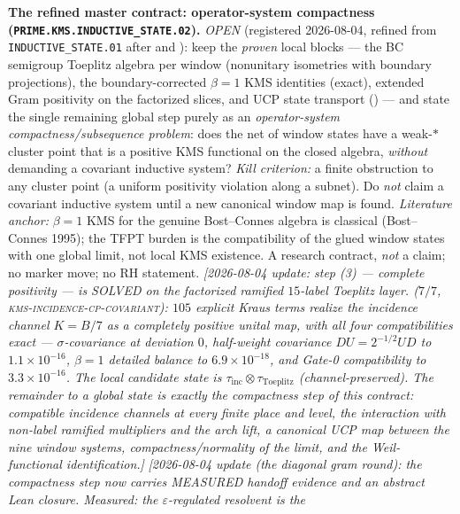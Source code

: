 \documentclass[11pt,a4paper]{article}
\begin{document}
\par\smallskip\noindent\textbf{The refined master contract:
operator-system compactness
(\texttt{PRIME.KMS.INDUCTIVE\_STATE.02}).}
{\sloppy
\emph{OPEN} (registered 2026-08-04, refined from
\texttt{INDUCTIVE\_STATE.01} after
 and
): keep the \emph{proven}
local blocks --- the BC semigroup Toeplitz algebra per window
(nonunitary isometries with boundary projections), the
boundary-corrected $\beta=1$ KMS identities (exact), extended Gram
positivity on the factorized slices, and UCP state transport
() --- and state the single
remaining global step purely as an \emph{operator-system
compactness/subsequence problem}: does the net of window states
have a weak-$*$ cluster point that is a positive KMS functional on
the closed algebra, \emph{without} demanding a covariant inductive
system?  \emph{Kill criterion:} a finite obstruction to any cluster
point (a uniform positivity violation along a subnet).  Do
\emph{not} claim a covariant inductive system until a new canonical
window map is found.  \emph{Literature anchor:} $\beta=1$ KMS for
the genuine Bost--Connes algebra is classical (Bost--Connes 1995);
the TFPT burden is the compatibility of the glued window states
with one global limit, not local KMS existence.  A research
contract, \emph{not} a claim; no marker move; no RH statement.
\emph{[2026-08-04 update: step (3) --- complete positivity --- is
SOLVED on the factorized ramified $15$-label Toeplitz layer.
 ($7/7$,
\textsc{kms-incidence-cp-covariant}): $105$ explicit Kraus terms
realize the incidence channel $K=B/7$ as a completely positive
unital map, with all four compatibilities exact ---
$\sigma$-covariance at deviation $0$, half-weight covariance
$DU=2^{-1/2}UD$ to $1.1\times10^{-16}$, $\beta=1$ detailed balance
to $6.9\times10^{-18}$, and Gate-0 compatibility to
$3.3\times10^{-16}$.  The local candidate state is
$\tau_{\mathrm{inc}}\otimes\tau_{\mathrm{Toeplitz}}$
(channel-preserved).  The remainder to a global state is exactly
the compactness step of this contract: compatible incidence
channels at every finite place and level, the interaction with
non-label ramified multipliers and the arch lift, a canonical UCP
map between the nine window systems, compactness/normality of the
limit, and the Weil-functional identification.]}
\emph{[2026-08-04 update (the diagonal gram round): the compactness
step now carries MEASURED handoff evidence and an abstract Lean
closure.  Measured: the $\varepsilon$-regulated resolvent is the
}}
\end{document}

